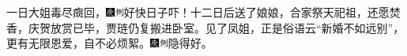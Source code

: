 {一日大姐毒尽癍回，{\includegraphics[width=3mm]{../Images/00004}\includegraphics[width=3mm]{../Images/00011}\footnotesize \kaishu 好快日子吓！}十二日后送了娘娘，合家祭天祀祖，还愿焚香，庆贺放赏已毕，贾琏仍复搬进卧室。见了凤姐，正是俗语云``新婚不如远别''，更有无限恩爱，自不必烦絮。{\includegraphics[width=3mm]{../Images/00004}\includegraphics[width=3mm]{../Images/00011}\footnotesize \kaishu 隐得好。}

}
